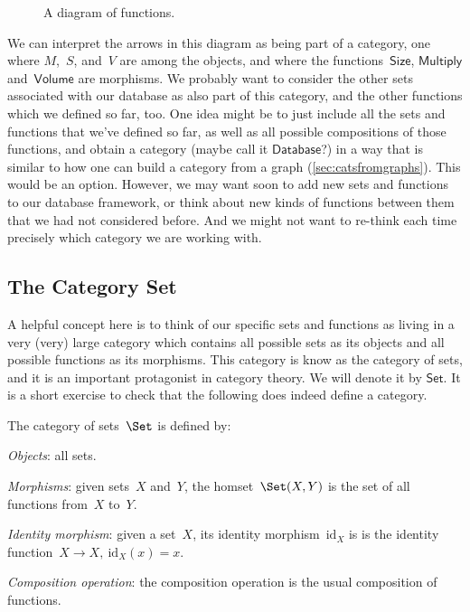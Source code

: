 \begin{figure}[h!]
\begin{center}
\end{center}
\caption{A diagram of functions. \label{fig:diagram_functions}}
\end{figure}

We can interpret the arrows in this diagram as being part of a category, one where $M$,~$S$, and~$V$ are among the objects, and where the functions~$\textsf{Size}$, $\textsf{Multiply}$ and~$\textsf{Volume}$ are morphisms. We probably want to consider the other sets associated with our database as also part of this category, and the other functions which we defined so far, too. One idea might be to just include all the sets and functions that we've defined so far, as well as all possible compositions of those functions, and obtain a category (maybe call it $\textsf{Database}$?) in a way that is similar to how one can build a category from a graph (\cref{sec:catsfromgraphs}). This would be an option. However, we may want soon to add new sets and functions to our database framework, or think about new kinds of functions between them that we had not considered before. And we might not want to re-think each time precisely which category we are working with.


\subsection{The Category Set}

A helpful concept here is to think of our specific sets and functions as living in a very (very) large category which contains all possible sets as its objects and all possible functions as its morphisms. This category is know as the category of sets, and it is an important protagonist in category theory. We will denote it by $\textsf{Set}$. It is a short exercise to check that the following does indeed define a category.

\begin{shaded*}
\begin{definition}
The category of sets~$\Set$ is defined by:
    \begin{compactenum}
    \item \emph{Objects}: all sets.
    \item \emph{Morphisms}: given sets~$X$ and~$Y$, the homset~$\Set(X,Y)$ is the set of all functions from~$X$ to~$Y$.
    \item \emph{Identity morphism}: given a set~$X$, its identity morphism~$\text{id}_X$ is
    is the identity function~$X \to X, \ \text{id}_X(x) = x$.
    \item \emph{Composition operation}: the composition operation is the usual composition of functions.
    \end{compactenum}
\end{definition}
\end{shaded*}

